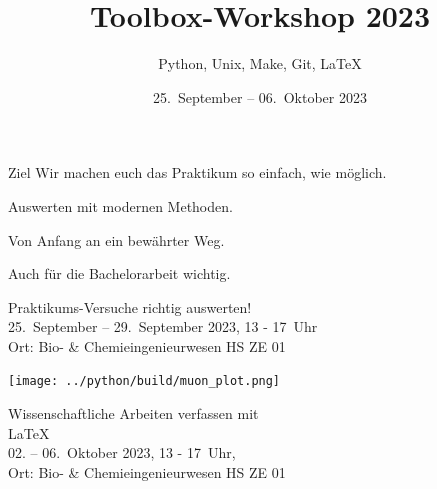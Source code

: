 

\title[Toolbox 2023]{Toolbox-Workshop 2023}
\subtitle{Python, Unix, Make, Git, \LaTeX{}}
\date{25.~September – 06.~Oktober 2023}
\author[Toolbox-Team]{}



\maketitle

\begin{frame}{Ziel}
  \setlength\parskip{3ex}
  \huge
  Wir machen euch das Praktikum so einfach, wie möglich.

  Auswerten mit modernen Methoden.

  Von Anfang an ein bewährter Weg.

  Auch für die Bachelorarbeit wichtig.
\end{frame}

\begin{frame}
  \vspace{0.7cm}
  \begin{center}
    \huge Praktikums-Versuche richtig auswerten!\\
    25.~September – 29.~September 2023, 13 - 17~Uhr\\%
    Ort: Bio- \& Chemieingenieurwesen HS ZE 01 %
  \end{center}
\end{frame}

\begin{frame}[plain]
  \texttt{[image: ../python/build/muon\_plot.png]}
\end{frame}

\begin{frame}
  \begin{center}
    \huge Wissenschaftliche Arbeiten verfassen mit \\[0.5\baselineskip]
    \textrm{\fontsize{80}{120}\selectfont\LaTeX{}}\\[0.5\baselineskip]
    02. – 06.~Oktober 2023, 13 - 17~Uhr,\\
    Ort: Bio- \& Chemieingenieurwesen HS ZE 01%
  \end{center}
\end{frame}

